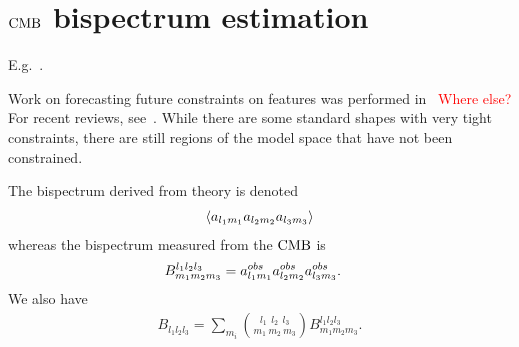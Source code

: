     \section{$\text{CMB}$ bispectrum estimation}
    E.g.~\cite{Smith_2011, Komatsu_2005, Byun_1, Byun_2, modal_battefeld}.


Work on forecasting future constraints on features was performed
    in~\cite{Sohn_2019} \textcolor{red}{Where else?}
    For recent reviews, see~\cite{astro2020_png, astro2020_features, Ballardini_2017, Sypsas_2017,
    Palma_2017}.
    While there are some standard shapes with very tight constraints,
    there are still regions of the model space that have not been constrained.


    The bispectrum derived from theory is denoted
    \begin{align}
        \left<a_{l_1m_1}a_{l_2m_2}a_{l_3m_3}\right>
    \end{align}
    whereas the bispectrum measured from the $\text{CMB}$ is
    \begin{align}
        B^{l_1l_2l_3}_{m_1m_2m_3} &= a^{obs}_{l_1m_1}a^{obs}_{l_2m_2}a^{obs}_{l_3m_3}.
    \end{align}
    We also have
    \begin{align}\label{eq:bll}
        B_{l_1l_2l_3} = \sum_{m_i} {{l_1~~l_2~~l_3} \choose {m_1~m_2~m_3}} B^{l_1l_2l_3}_{m_1m_2m_3}.
    \end{align}


